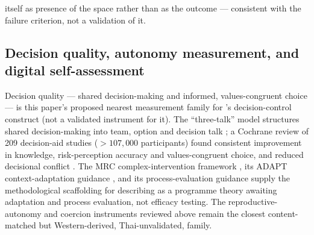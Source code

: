 itself as presence of the space rather than as the outcome --- consistent with the failure criterion, not a validation of it.

\subsection{Decision quality, autonomy measurement, and digital self-assessment}
Decision quality --- shared decision-making and informed, values-congruent choice --- is this paper's proposed nearest measurement family for \tphe{}'s decision-control construct (not a validated instrument for it). The ``three-talk'' model structures shared decision-making into team, option and decision talk \cite{ref15}; a Cochrane review of 209 decision-aid studies ($>107{,}000$ participants) found consistent improvement in knowledge, risk-perception accuracy and values-congruent choice, and reduced decisional conflict \cite{ref14}. The MRC complex-intervention framework \cite{ref52}, its ADAPT context-adaptation guidance \cite{ref53}, and its process-evaluation guidance \cite{ref54} supply the methodological scaffolding for describing \tphe{} as a programme theory awaiting adaptation and process evaluation, not efficacy testing. The reproductive-autonomy and coercion instruments reviewed above \cite{ref16,ref17,ref18} remain the closest content-matched but Western-derived, Thai-unvalidated, family.

